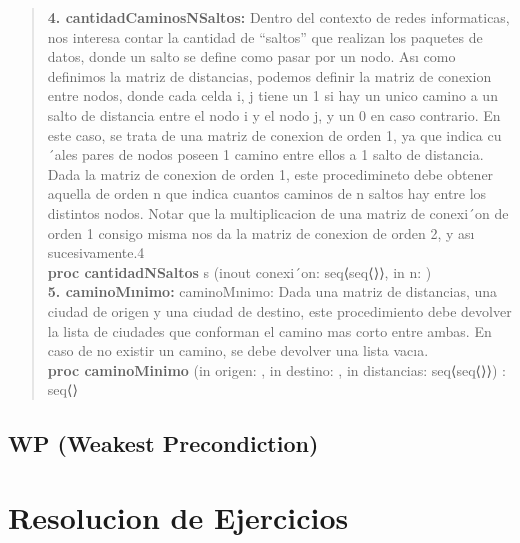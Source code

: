 \documentclass[10pt,a4paper]{article}
\begin{document}
\begin{quote}
\textbf{4. cantidadCaminosNSaltos:} Dentro del contexto de redes informaticas, nos interesa contar la cantidad de “saltos”
que realizan los paquetes de datos, donde un salto se define como pasar por un nodo.
Ası como definimos la matriz de distancias, podemos definir la matriz de conexion entre nodos, donde cada celda i, j
tiene un 1 si hay un unico camino a un salto de distancia entre el nodo i y el nodo j, y un 0 en caso contrario. En este
caso, se trata de una matriz de conexion de orden 1, ya que indica cu´ales pares de nodos poseen 1 camino entre ellos a
1 salto de distancia.
Dada la matriz de conexion de orden 1, este procedimineto debe obtener aquella de orden n que indica cuantos caminos
de n saltos hay entre los distintos nodos. Notar que la multiplicacion de una matriz de conexi´on de orden 1 consigo
misma nos da la matriz de conexion de orden 2, y ası sucesivamente.4
\\
\vspace{0.2cm}
\textbf{proc cantidadNSaltos } s (inout conexi´on: seq⟨seq⟨\ent⟩⟩, in n: \ent)
\vspace{0.2cm}
\\
\vspace{0.2cm}
\textbf{5. caminoMınimo:} caminoMınimo: Dada una matriz de distancias, una ciudad de origen y una ciudad de destino, este procedimiento
debe devolver la lista de ciudades que conforman el camino mas corto entre ambas. En caso de no existir un camino,
se debe devolver una lista vacıa.
\\
\textbf{proc caminoMinimo} (in origen: \ent, in destino: \ent, in distancias: seq⟨seq⟨\ent⟩⟩) : seq⟨\ent⟩
\end {quote}
\subsection{WP (Weakest Precondiction)}

\section{Resolucion de Ejercicios}
\end{document}
